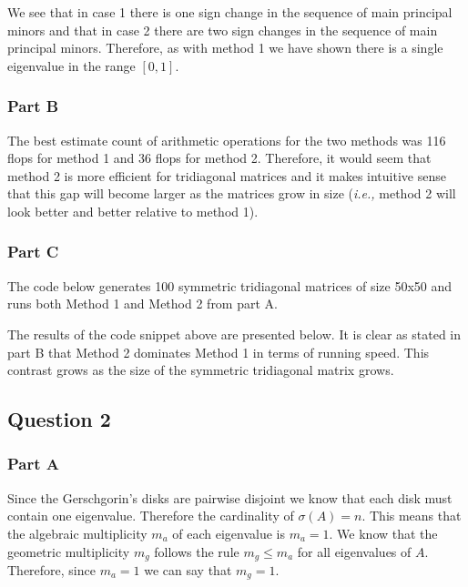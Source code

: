 We see that in case 1 there is one sign change in the sequence of main principal minors and that in case 2 there are two sign changes in the sequence of main principal minors.
Therefore, as with method 1 we have shown there is a single eigenvalue in the range \([0,1]\).

\subsubsection{Part B}

The best estimate count of arithmetic operations for the two methods was 116 flops for method 1 and 36 flops for method 2.
Therefore, it would seem that method 2 is more efficient for tridiagonal matrices and it makes intuitive sense that this gap will become larger as the matrices grow in size ({\em i.e.,} method 2 will look better and better relative to method 1).

\newpage
\subsubsection{Part C}

The code below generates 100 symmetric tridiagonal matrices of size 50x50 and runs both Method 1 and Method 2 from part A.



The results of the code snippet above are presented below.
It is clear as stated in part B that Method 2 dominates Method 1 in terms of running speed.
This contrast grows as the size of the symmetric tridiagonal matrix grows.


\newpage
\subsection{Question 2}
\subsubsection{Part A}

Since the Gerschgorin's disks are pairwise disjoint we know that each disk must contain one eigenvalue.
Therefore the cardinality of \(\sigma(A) = n\).
This means that the algebraic multiplicity \(m_a\) of each eigenvalue is \(m_a = 1\).
We know that the geometric multiplicity \(m_g\) follows the rule \(m_g \leq m_a\) for all eigenvalues of \(A\).
Therefore, since \(m_a = 1\) we can say that \(m_g = 1\). 


